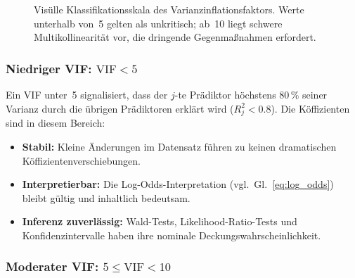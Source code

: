 ﻿\documentclass[12pt, a4paper]{article}
\theoremstyle{definition}
\theoremstyle{remark}
\begin{document}
\begin{figure}[H]
	\centering
	\caption{Visülle Klassifikationsskala des Varianzinflationsfaktors. 
		Werte unterhalb von~5 gelten als unkritisch; ab~10 liegt schwere 
		Multikollinearität vor, die dringende Gegenmaßnahmen erfordert.}
	\label{fig:vif_scale}
\end{figure}

\subsubsection{Niedriger VIF: $\mathrm{VIF} < 5$}

Ein VIF unter~5 signalisiert, dass der $j$-te Prädiktor höchstens $80\,\%$ seiner Varianz
durch die übrigen Prädiktoren erklärt wird ($R_j^2 < 0.8$). Die Köffizienten sind in diesem
Bereich:
\begin{itemize}
	\item \textbf{Stabil:} Kleine Änderungen im Datensatz führen zu keinen dramatischen
	Köffizientenverschiebungen.
	\item \textbf{Interpretierbar:} Die Log-Odds-Interpretation (vgl.~Gl.~\eqref{eq:log_odds})
	bleibt gültig und inhaltlich bedeutsam.
	\item \textbf{Inferenz zuverlässig:} Wald-Tests, Likelihood-Ratio-Tests und Konfidenzintervalle
	haben ihre nominale Deckungswahrscheinlichkeit.
\end{itemize}

\subsubsection{Moderater VIF: $5 \leq \mathrm{VIF} < 10$}
\end{document}
